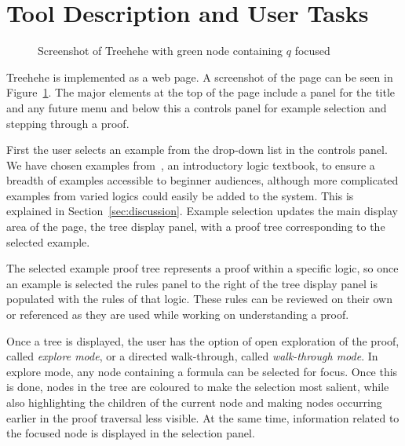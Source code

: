 \documentclass[conference]{IEEEtran}
\newcommand{\projectname}{Treehehe}
\begin{document}
\section{Tool Description and User Tasks}
\label{sec:tooldesc}

\begin{figure}

\begin{center}
\end{center}

\caption{Screenshot of \projectname{} with green node containing $q$ focused}
\label{fig:screenshot}

\end{figure}

\projectname{} is implemented as a web page. A screenshot of the page can be seen in Figure~\ref{fig:screenshot}. The major elements at the top of the page include a panel for the title and any future menu and below this a controls panel for example selection and stepping through a proof.

First the user selects an example from the drop-down list in the controls panel. We have chosen examples from~\cite{logicincs-huth+ryan}, an introductory logic textbook, to ensure a breadth of examples accessible to beginner audiences, although more complicated examples from varied logics could easily be added to the system. This is explained in Section~\ref{sec:discussion}. Example selection updates the main display area of the page, the tree display panel, with a proof tree corresponding to the selected example.

The selected example proof tree represents a proof within a specific logic, so once an example is selected the rules panel to the right of the tree display panel is populated with the rules of that logic. These rules can be reviewed on their own or referenced as they are used while working on understanding a proof.

Once a tree is displayed, the user has the option of open exploration of the proof, called \textit{explore mode}, or a directed walk-through, called \textit{walk-through mode}. In explore mode, any node containing a formula can be selected for focus. Once this is done, nodes in the tree are coloured to make the selection most salient, while also highlighting the children of the current node and making nodes occurring earlier in the proof traversal less visible. At the same time, information related to the focused node is displayed in the selection panel.
\end{document}
